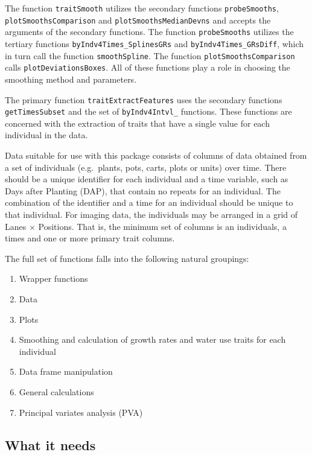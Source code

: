 \documentclass[
]{article}
\begin{document}
The function \texttt{traitSmooth} utilizes the secondary functions
\texttt{probeSmooths}, \texttt{plotSmoothsComparison} and
\texttt{plotSmoothsMedianDevns} and accepts the arguments of the
secondary functions. The function \texttt{probeSmooths} utilizes the
tertiary functions \texttt{byIndv4Times\_SplinesGRs} and
\texttt{byIndv4Times\_GRsDiff}, which in turn call the function
\texttt{smoothSpline}. The function \texttt{plotSmoothsComparison} calls
\texttt{plotDeviationsBoxes}. All of these functions play a role in
choosing the smoothing method and parameters.

The primary function \texttt{traitExtractFeatures} uses the secondary
functions \texttt{getTimesSubset} and the set of \texttt{byIndv4Intvl\_}
functions. These functions are concerned with the extraction of traits
that have a single value for each individual in the data.

Data suitable for use with this package consists of columns of data
obtained from a set of individuals (e.g.~plants, pots, carts, plots or
units) over time. There should be a unique identifier for each
individual and a time variable, such as Days after Planting (DAP), that
contain no repeats for an individual. The combination of the identifier
and a time for an individual should be unique to that individual. For
imaging data, the individuals may be arranged in a grid of Lanes
\(\times\) Positions. That is, the minimum set of columns is an
individuals, a times and one or more primary trait columns.

The full set of functions falls into the following natural groupings:

\begin{enumerate}
\def\labelenumi{(\roman{enumi})}
\item
  Wrapper functions
\item
  Data
\item
  Plots
\item
  Smoothing and calculation of growth rates and water use traits for
  each individual
\item
  Data frame manipulation
\item
  General calculations
\item
  Principal variates analysis (PVA)
\end{enumerate}

\subsection{What it needs}\label{what-it-needs}
\end{document}
